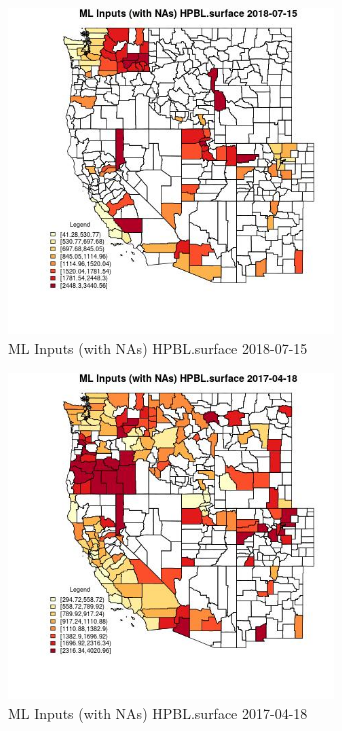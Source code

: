 \clearpage 

\begin{figure} 
\centering  
\includegraphics[width=0.77\textwidth]{Code_Outputs/Report_ML_input_PM25_Step4_part_e_de_duplicated_aves_compiled_2019-05-21wNAs_CountyHPBLsurfaceMean2018-07-15.jpg} 
\caption{\label{fig:Report_ML_input_PM25_Step4_part_e_de_duplicated_aves_compiled_2019-05-21wNAsCountyHPBLsurfaceMean2018-07-15}ML Inputs (with NAs) HPBL.surface 2018-07-15} 
\end{figure} 
 

\begin{figure} 
\centering  
\includegraphics[width=0.77\textwidth]{Code_Outputs/Report_ML_input_PM25_Step4_part_e_de_duplicated_aves_compiled_2019-05-21wNAs_CountyHPBLsurfaceMean2017-04-18.jpg} 
\caption{\label{fig:Report_ML_input_PM25_Step4_part_e_de_duplicated_aves_compiled_2019-05-21wNAsCountyHPBLsurfaceMean2017-04-18}ML Inputs (with NAs) HPBL.surface 2017-04-18} 
\end{figure} 
 

